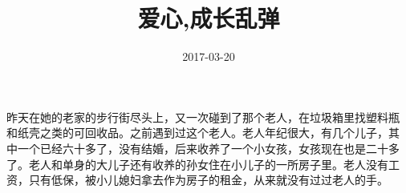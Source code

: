 \documentclass[11pt]{article}
\date{2017-03-20}
\title{爱心,成长乱弹}
\begin{document}
\maketitle
昨天在她的老家的步行街尽头上，又一次碰到了那个老人，在垃圾箱里找塑料瓶
和纸壳之类的可回收品。之前遇到过这个老人。老人年纪很大，有几个儿子，其
中一个已经六十多了，没有结婚，后来收养了一个小女孩，女孩现在也是二十多
了。老人和单身的大儿子还有收养的孙女住在小儿子的一所房子里。老人没有工
资，只有低保，被小儿媳妇拿去作为房子的租金，从来就没有过过老人的手。
\end{document}
